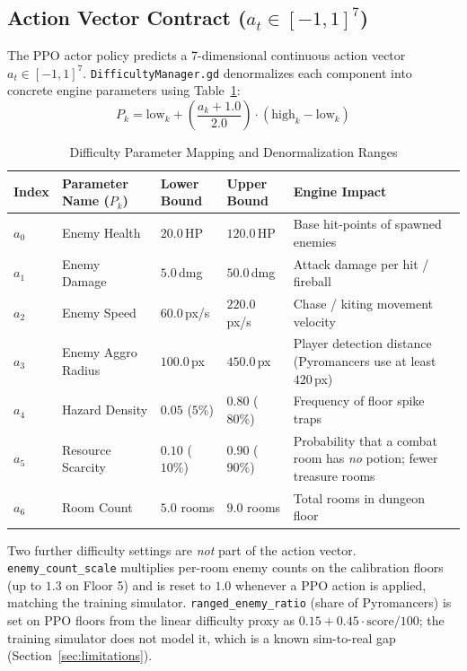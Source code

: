\subsection{Action Vector Contract ($a_t \in [-1, 1]^7$)}
The PPO actor policy predicts a 7-dimensional continuous action vector $a_t \in [-1, 1]^7$. \texttt{DifficultyManager.gd} denormalizes each component into concrete engine parameters using Table~\ref{tab:param_ranges}:
\begin{equation}
P_k = \text{low}_k + \left( \frac{a_k + 1.0}{2.0} \right) \cdot (\text{high}_k - \text{low}_k)
\label{eq:denorm}
\end{equation}

\begin{table}[!htbp]
\centering
\caption{Difficulty Parameter Mapping and Denormalization Ranges}
\label{tab:param_ranges}
\small
\begin{tabular}{p{}p{}p{}p{}p{}}
\toprule
\textbf{Index} & \textbf{Parameter Name ($P_k$)} & \textbf{Lower Bound} & \textbf{Upper Bound} & \textbf{Engine Impact} \\
\midrule
$a_0$ & Enemy Health & $20.0$\,HP & $120.0$\,HP & Base hit-points of spawned enemies \\
$a_1$ & Enemy Damage & $5.0$\,dmg & $50.0$\,dmg & Attack damage per hit / fireball \\
$a_2$ & Enemy Speed & $60.0$\,px/s & $220.0$\,px/s & Chase / kiting movement velocity \\
$a_3$ & Enemy Aggro Radius & $100.0$\,px & $450.0$\,px & Player detection distance (Pyromancers use at least $420$\,px) \\
$a_4$ & Hazard Density & $0.05$ ($5\%$) & $0.80$ ($80\%$) & Frequency of floor spike traps \\
$a_5$ & Resource Scarcity & $0.10$ ($10\%$) & $0.90$ ($90\%$) & Probability that a combat room has \emph{no} potion; fewer treasure rooms \\
$a_6$ & Room Count & $5.0$ rooms & $9.0$ rooms & Total rooms in dungeon floor \\
\bottomrule
\end{tabular}
\end{table}

Two further difficulty settings are \emph{not} part of the action vector. \texttt{enemy\_count\_scale} multiplies per-room enemy counts on the calibration floors (up to $1.3$ on Floor 5) and is reset to $1.0$ whenever a PPO action is applied, matching the training simulator. \texttt{ranged\_enemy\_ratio} (share of Pyromancers) is set on PPO floors from the linear difficulty proxy as $0.15 + 0.45\cdot\text{score}/100$; the training simulator does not model it, which is a known sim-to-real gap (Section~\ref{sec:limitations}).

